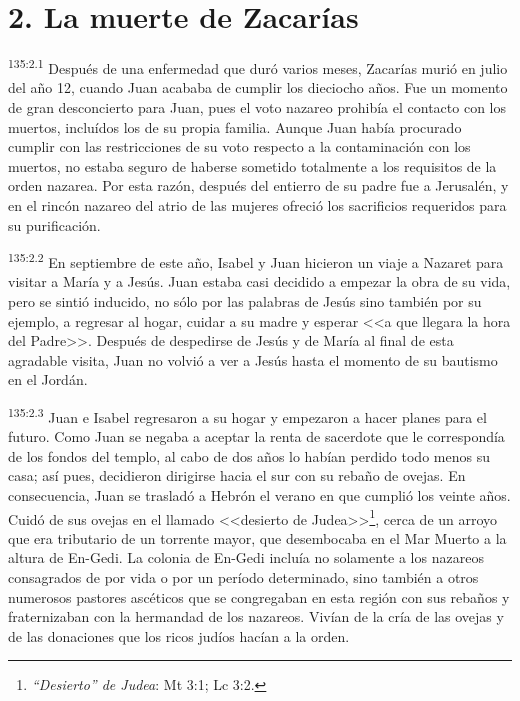 \section*{2. La muerte de Zacarías}
\par 
\textsuperscript{135:2.1} Después de una enfermedad que duró varios meses, Zacarías murió en julio del año 12, cuando Juan acababa de cumplir los dieciocho años. Fue un momento de gran desconcierto para Juan, pues el voto nazareo prohibía el contacto con los muertos, incluídos los de su propia familia. Aunque Juan había procurado cumplir con las restricciones de su voto respecto a la contaminación con los muertos, no estaba seguro de haberse sometido totalmente a los requisitos de la orden nazarea. Por esta razón, después del entierro de su padre fue a Jerusalén, y en el rincón nazareo del atrio de las mujeres ofreció los sacrificios requeridos para su purificación.

\par 
\textsuperscript{135:2.2} En septiembre de este año, Isabel y Juan hicieron un viaje a Nazaret para visitar a María y a Jesús. Juan estaba casi decidido a empezar la obra de su vida, pero se sintió inducido, no sólo por las palabras de Jesús sino también por su ejemplo, a regresar al hogar, cuidar a su madre y esperar <<a que llegara la hora del Padre>>. Después de despedirse de Jesús y de María al final de esta agradable visita, Juan no volvió a ver a Jesús hasta el momento de su bautismo en el Jordán.

\par 
\textsuperscript{135:2.3} Juan e Isabel regresaron a su hogar y empezaron a hacer planes para el futuro. Como Juan se negaba a aceptar la renta de sacerdote que le correspondía de los fondos del templo, al cabo de dos años lo habían perdido todo menos su casa; así pues, decidieron dirigirse hacia el sur con su rebaño de ovejas. En consecuencia, Juan se trasladó a Hebrón el verano en que cumplió los veinte años. Cuidó de sus ovejas en el llamado <<desierto de Judea>>\footnote{\textit{``Desierto'' de Judea}: Mt 3:1; Lc 3:2.}, cerca de un arroyo que era tributario de un torrente mayor, que desembocaba en el Mar Muerto a la altura de En-Gedi. La colonia de En-Gedi incluía no solamente a los nazareos consagrados de por vida o por un período determinado, sino también a otros numerosos pastores ascéticos que se congregaban en esta región con sus rebaños y fraternizaban con la hermandad de los nazareos. Vivían de la cría de las ovejas y de las donaciones que los ricos judíos hacían a la orden.

